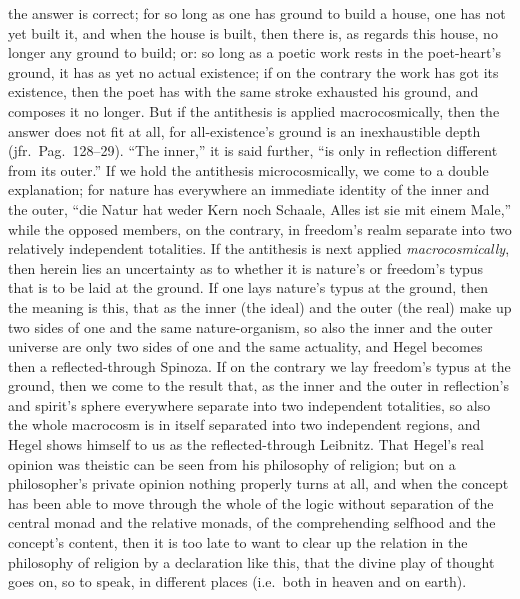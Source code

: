 \documentclass[12pt]{book}
\begin{document}
the answer is correct; for so long as one has ground to build a house, one
has not yet built it, and when the house is built, then there is, as regards
this house, no longer any ground to build; or: so long as a poetic work
rests in the poet-heart's ground, it has as yet no actual existence; if on
the contrary the work has got its existence, then the poet has with the same
stroke exhausted his ground, and composes it no longer. But if the
antithesis is applied macrocosmically, then the answer does not fit at all,
for all-existence's ground is an inexhaustible depth (jfr.\ Pag.\ 128--29).
``The inner,'' it is said further, ``is only in reflection different from
its outer.'' If we hold the antithesis microcosmically, we come to a double
explanation; for nature has everywhere an immediate identity of the inner
and the outer, ``die Natur hat weder Kern noch Schaale, Alles ist sie mit
einem Male,'' while the opposed members, on the contrary, in freedom's realm
separate into two relatively independent totalities. If the antithesis is
next applied \emph{macrocosmically}, then herein lies an uncertainty as to
whether it is nature's or freedom's typus that is to be laid at the ground.
If one lays nature's typus at the ground, then the meaning is this, that as
the inner (the ideal) and the outer (the real) make up two sides of one and
the same nature-organism, so also the inner and the outer universe are only
two sides of one and the same actuality, and Hegel becomes then a
reflected-through Spinoza. If on the contrary we lay freedom's typus at the
ground, then we come to the result that, as the inner and the outer in
reflection's and spirit's sphere everywhere separate into two independent
totalities, so also the whole macrocosm is in itself separated into two
independent regions, and Hegel shows himself to us as the reflected-through
Leibnitz. That Hegel's real opinion was theistic can be seen from his
philosophy of religion; but on a philosopher's private opinion nothing
properly turns at all, and when the concept has been able to move through
the whole of the logic without separation of the central monad and the
relative monads, of the comprehending selfhood and the concept's content,
then it is too late to want to clear up the relation in the philosophy of
religion by a declaration like this, that the divine play of thought goes
on, so to speak, in different places (i.e.\ both in heaven and on earth).
\end{document}
